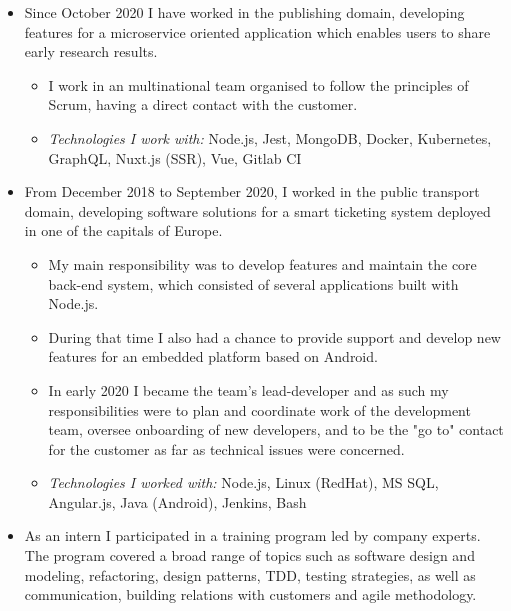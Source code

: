 \documentclass[10pt,a4paper,ragged2e]{altacv}
\begin{document}
\begin{itemize}
    \item Since October 2020 I have worked in the publishing domain, developing features for
    a microservice oriented application which enables users to share early research results.
    \begin{itemize}
        \item I work in an multinational team organised to follow the principles of Scrum,
        having a direct contact with the customer.
        \item \textit{Technologies I work with:} Node.js, Jest, MongoDB, Docker, Kubernetes, GraphQL, Nuxt.js (SSR),
        Vue, Gitlab CI
    \end{itemize}
 \divider
    \item From December 2018 to September 2020, I worked in the public transport domain,
    developing software solutions for a smart ticketing system deployed in one of the capitals of Europe.
    \begin{itemize}
        \item My main responsibility was to develop features and maintain the core back-end system,
        which consisted of several applications built with Node.js.
        \item During that time I also had a chance to provide support and develop new features
        for an embedded platform based on Android.
        \item In early 2020 I became the team’s lead-developer and as such my responsibilities
        were to plan and coordinate work of the development team, oversee onboarding of new
        developers, and to be the "go to" contact for the customer as far as technical
        issues were concerned.
        \item \textit{Technologies I worked with:} Node.js, Linux (RedHat), MS SQL, Angular.js,
        Java (Android), Jenkins, Bash
    \end{itemize}
\end{itemize}

\divider

\begin{itemize}
    \item As an intern I participated in a training program led by company experts.
    The program covered a broad range of topics such as software design and modeling,
    refactoring, design patterns, TDD, testing strategies, as well as communication,
    building relations with customers and agile methodology.
\end{itemize}
\end{document}
